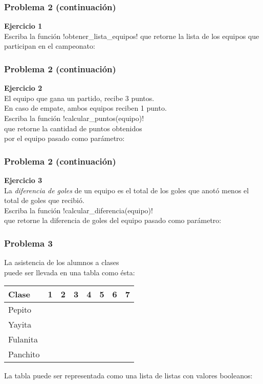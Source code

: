 \documentclass[12pt]{beamer}
\newcommand{\T}{\ding{51}}
\newcommand{\F}{}
\begin{document}
  \begin{frame}
    \frametitle{Problema 2 (continuación)}
    \label{problema-futbol-2}
    \textbf{Ejercicio 1} \\
    Escriba la función \li!obtener_lista_equipos!
    que retorne la lista de los equipos
    que participan en el campeonato:
    
  \end{frame}

  \begin{frame}
    \frametitle{Problema 2 (continuación)}
    \label{problema-futbol-3}
    \textbf{Ejercicio 2} \\
    El equipo que gana un partido, recibe 3 puntos. \\
    En caso de empate, ambos equipos reciben 1 punto. \\
    \vspace{1ex}
    Escriba la función \li!calcular_puntos(equipo)! \\
    que retorne la cantidad de puntos obtenidos \\
    por el equipo pasado como parámetro:
    
  \end{frame}

  \begin{frame}
    \frametitle{Problema 2 (continuación)}
    \label{problema-futbol-4}
    \textbf{Ejercicio 3} \\
    La \emph{diferencia de goles} de un equipo
    es el total de los goles que anotó menos el total de goles que recibió. \\
    \vspace{1ex}
    Escriba la función \li!calcular_diferencia(equipo)! \\
    que retorne la diferencia de goles
    del equipo pasado como parámetro:
    
  \end{frame}

  \begin{frame}
    \frametitle{Problema 3}
    \label{problema-asistencia-1}
    La asistencia de los alumnos a clases \\
    puede ser llevada en una tabla como ésta:
    {\footnotesize
    \begin{tabular}{|l|c|c|c|c|c|c|c|}\hline
      Clase    & 1& 2& 3& 4& 5& 6& 7\\\hline\hline
      Pepito   &\T&\T&\T&\F&\F&\F&\F\\\hline
      Yayita   &\T&\T&\T&\F&\T&\F&\T\\\hline
      Fulanita &\T&\T&\T&\T&\T&\T&\T\\\hline
      Panchito &\T&\T&\T&\F&\T&\T&\T\\\hline
    \end{tabular}
    }

    \vspace{1ex}
    La tabla puede ser representada como una lista de listas con valores booleanos:
    \footnotesize
    
  \end{frame}
\end{document}
